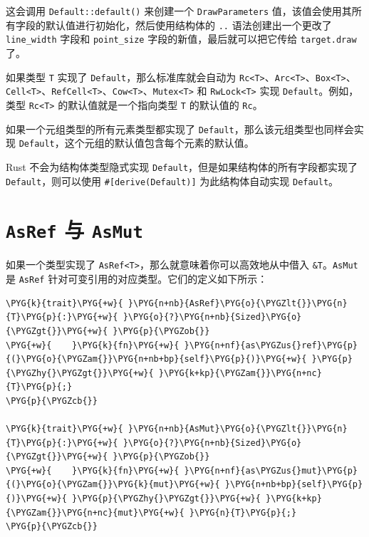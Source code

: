 这会调用 \texttt{Default::default()} 来创建一个 \texttt{DrawParameters} 值，该值会使用其所有字段的默认值进行初始化，然后使用结构体的 \texttt{..} 语法创建出一个更改了 \texttt{line\_width} 字段和 \texttt{point\_size} 字段的新值，最后就可以把它传给 \texttt{target.draw} 了。

如果类型 \texttt{T} 实现了 \texttt{Default}，那么标准库就会自动为 \texttt{Rc<T>}、\texttt{Arc<T>}、\texttt{Box<T>}、\texttt{Cell<T>}、\texttt{RefCell<T>}、\texttt{Cow<T>}、\texttt{Mutex<T>} 和 \texttt{RwLock<T>} 实现 \texttt{Default}。例如，类型 \texttt{Rc<T>} 的默认值就是一个指向类型 \texttt{T} 的默认值的 \texttt{Rc}。

如果一个元组类型的所有元素类型都实现了 \texttt{Default}，那么该元组类型也同样会实现 \texttt{Default}，这个元组的默认值包含每个元素的默认值。

Rust 不会为结构体类型隐式实现 \texttt{Default}，但是如果结构体的所有字段都实现了 \texttt{Default}，则可以使用 \texttt{\#[derive(Default)]} 为此结构体自动实现 \texttt{Default}。

\section{\texttt{AsRef} 与 \texttt{AsMut}}

如果一个类型实现了 \texttt{AsRef<T>}，那么就意味着你可以高效地从中借入 \texttt{\&T}。\texttt{AsMut} 是 \texttt{AsRef} 针对可变引用的对应类型。它们的定义如下所示：

\begin{Verbatim}[commandchars=\\\{\},breaklines=true,breakanywhere=true,fontsize=\codefont,xleftmargin=17bp]
\PYG{k}{trait}\PYG{+w}{ }\PYG{n+nb}{AsRef}\PYG{o}{\PYGZlt{}}\PYG{n}{T}\PYG{p}{:}\PYG{+w}{ }\PYG{o}{?}\PYG{n+nb}{Sized}\PYG{o}{\PYGZgt{}}\PYG{+w}{ }\PYG{p}{\PYGZob{}}
\PYG{+w}{    }\PYG{k}{fn}\PYG{+w}{ }\PYG{n+nf}{as\PYGZus{}ref}\PYG{p}{(}\PYG{o}{\PYGZam{}}\PYG{n+nb+bp}{self}\PYG{p}{)}\PYG{+w}{ }\PYG{p}{\PYGZhy{}\PYGZgt{}}\PYG{+w}{ }\PYG{k+kp}{\PYGZam{}}\PYG{n+nc}{T}\PYG{p}{;}
\PYG{p}{\PYGZcb{}}

\PYG{k}{trait}\PYG{+w}{ }\PYG{n+nb}{AsMut}\PYG{o}{\PYGZlt{}}\PYG{n}{T}\PYG{p}{:}\PYG{+w}{ }\PYG{o}{?}\PYG{n+nb}{Sized}\PYG{o}{\PYGZgt{}}\PYG{+w}{ }\PYG{p}{\PYGZob{}}
\PYG{+w}{    }\PYG{k}{fn}\PYG{+w}{ }\PYG{n+nf}{as\PYGZus{}mut}\PYG{p}{(}\PYG{o}{\PYGZam{}}\PYG{k}{mut}\PYG{+w}{ }\PYG{n+nb+bp}{self}\PYG{p}{)}\PYG{+w}{ }\PYG{p}{\PYGZhy{}\PYGZgt{}}\PYG{+w}{ }\PYG{k+kp}{\PYGZam{}}\PYG{n+nc}{mut}\PYG{+w}{ }\PYG{n}{T}\PYG{p}{;}
\PYG{p}{\PYGZcb{}}
\end{Verbatim}

